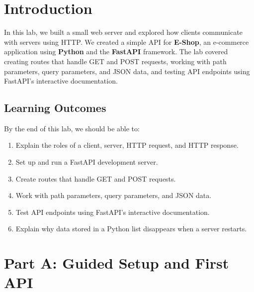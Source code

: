 \documentclass[12pt]{article}
\begin{document}
	\tableofcontents
	\newpage
	\newpage
	
	\section{Introduction}
	
	In this lab, we built a small web server and explored how clients communicate with servers using HTTP. We created a simple API for \textbf{E-Shop}, an e-commerce application using \textbf{Python} and the \textbf{FastAPI} framework. The lab covered creating routes that handle GET and POST requests, working with path parameters, query parameters, and JSON data, and testing API endpoints using FastAPI's interactive documentation.
	
	\subsection{Learning Outcomes}
	
	By the end of this lab, we should be able to:
	
	\begin{enumerate}
		\item Explain the roles of a client, server, HTTP request, and HTTP response.
		\item Set up and run a FastAPI development server.
		\item Create routes that handle GET and POST requests.
		\item Work with path parameters, query parameters, and JSON data.
		\item Test API endpoints using FastAPI's interactive documentation.
		\item Explain why data stored in a Python list disappears when a server restarts.
	\end{enumerate}
	
	\newpage
	
	\section{Part A: Guided Setup and First API}
	
\end{document}
